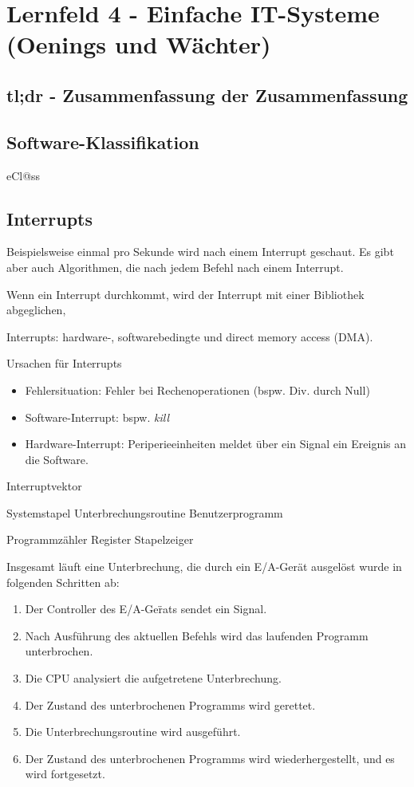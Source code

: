 \section{Lernfeld 4 - Einfache IT-Systeme (Oenings und Wächter)}
%
\subsection{tl;dr - Zusammenfassung der Zusammenfassung}

\subsection{Software-Klassifikation}
eCl@ss


\subsection{Interrupts}
Beispielsweise einmal pro Sekunde wird nach einem Interrupt geschaut. Es gibt aber auch Algorithmen, die nach jedem Befehl nach einem Interrupt.

Wenn ein Interrupt durchkommt, wird der Interrupt mit einer Bibliothek abgeglichen, 

Interrupts: hardware-, softwarebedingte und direct memory access (DMA).

Ursachen für Interrupts
\begin{itemize}
	\item Fehlersituation: Fehler bei Rechenoperationen (bspw. Div. durch Null)
	\item Software-Interrupt: bspw. {\it kill}
	\item Hardware-Interrupt: Periperieeinheiten meldet über ein Signal ein Ereignis an die Software.
\end{itemize}

Interruptvektor

Systemstapel
Unterbrechungsroutine
Benutzerprogramm

Programmzähler
Register
Stapelzeiger

Insgesamt läuft eine Unterbrechung, die durch ein E/A-Gerät ausgelöst wurde in folgenden Schritten ab:
\begin{enumerate}
	\item Der Controller des E/A-Ger̈ats sendet ein Signal.
	\item Nach Ausführung des aktuellen Befehls wird das laufenden Programm unterbrochen.
	\item Die CPU analysiert die aufgetretene Unterbrechung.
	\item Der Zustand des unterbrochenen Programms wird gerettet.
	\item Die Unterbrechungsroutine wird ausgeführt.
	\item Der Zustand des unterbrochenen Programms wird wiederhergestellt, und es wird fortgesetzt.
\end{enumerate}


